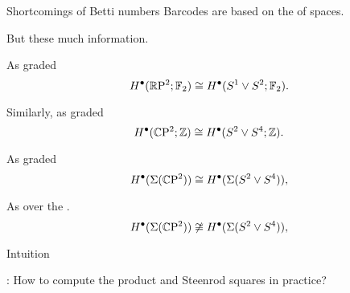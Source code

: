 
\begin{frame}{Shortcomings of Betti numbers}
	\pause
	Barcodes are based on the  of spaces.

	\pause\bigskip
	But these  much information.

	\pause\bigskip
	As graded 
	\[
	H^\bullet(\mathbb{R} \mathrm{P}^2; {\mathbb{F}_2}) \cong H^\bullet(S^1 \vee S^2; {\mathbb{F}_2}).
	\]

	\pause
	Similarly, as graded 
	\[
	H^\bullet(\mathbb{C} \mathrm{P}^2; \mathbb{Z}) \cong H^\bullet(S^2 \vee S^4; \mathbb{Z}).
	\]

	\pause
	As graded 
	\[
	H^\bullet(\Sigma(\mathbb{C} \mathrm{P}^2)) \cong H^\bullet(\Sigma(S^2 \vee S^4)),
	\]

	\pause\medskip
	As  over the .
	\[
	H^\bullet(\Sigma(\mathbb{C} \mathrm{P}^2)) \not\cong H^\bullet(\Sigma(S^2 \vee S^4)),
	\]
\end{frame}

\begin{frame}{Intuition}
	\pause
	\begin{figure}
	\end{figure}

	\pause\bigskip
	: How to compute the product and Steenrod squares in practice?
\end{frame}